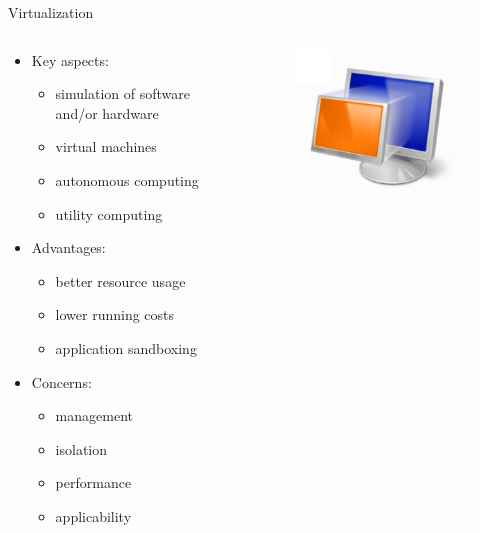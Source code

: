 \begin{frame}{Virtualization}
	\begin{columns}[T]
		\begin{column}{.5\textwidth}
			\begin{itemize}
			\item Key aspects:
				\begin{itemize}
				\item simulation of software and/or hardware
				\item virtual machines
				\item autonomous computing
				\item utility computing
				\end{itemize}
			\item Advantages:
				\begin{itemize}
				\item better resource usage
				\item lower running costs
				\item application sandboxing
				\end{itemize}
			\item Concerns:
				\begin{itemize}
				\item management
				\item isolation
				\item performance
				\item applicability
				\end{itemize}
			\end{itemize}	
		\end{column}
		\begin{column}{.5\textwidth}
			\begin{figure}[hb]
				\centering
				\includegraphics[width=\textwidth]{img/virt.png}
			\end{figure}
		\end{column}
	\end{columns}
\end{frame}

